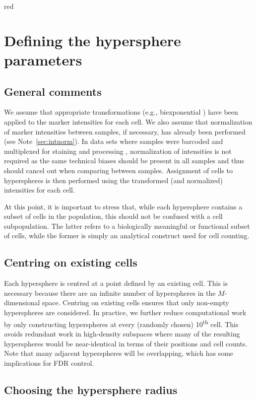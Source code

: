 \documentclass{article}
\begin{document}
\begin{color}{red}
\section{Defining the hypersphere parameters}

\subsection{General comments}
We assume that appropriate transformations (e.g., biexponential \cite{parks2006new}) have been applied to the marker intensities for each cell.
We also assume that normalization of marker intensities between samples, if necessary, has already been performed (see Note~\ref{sec:intnorm}).
In data sets where samples were barcoded and multiplexed for staining and processing \cite{zunder2015palladium}, normalization of intensities is not required as the same technical biases should be present in all samples and thus should cancel out when comparing between samples.
Assignment of cells to hyperspheres is then performed using the transformed (and normalized) intensities for each cell.

At this point, it is important to stress that, while each hypersphere contains a subset of cells in the population, this should not be confused with a cell subpopulation.
The latter refers to a biologically meaningful or functional subset of cells, while the former is simply an analytical construct used for cell counting.

\subsection{Centring on existing cells}
Each hypersphere is centred at a point defined by an existing cell.
This is necessary because there are an infinite number of hyperspheres in the $M$-dimensional space.
Centring on existing cells ensures that only non-empty hyperspheres are considered.
In practice, we further reduce computational work by only constructing hyperspheres at every (randomly chosen) 10\textsuperscript{th} cell.
This avoids redundant work in high-density subspaces where many of the resulting hyperspheres would be near-identical in terms of their positions and cell counts.
Note that many adjacent hyperspheres will be overlapping, which has some implications for FDR control.

\subsection{Choosing the hypersphere radius}


\end{color}
\end{document}
